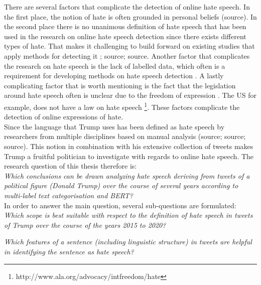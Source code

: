 \documentclass[a4paper,pdf]{article}
\begin{document}
There are several factors that complicate the detection of online hate speech. In the first place, the notion of hate is often grounded in personal beliefs (source). In the second place there is no unanimous definition of hate speech that has been used in the research on online hate speech detection \cite{Salminen2020DevelopingPlatforms} since there exists different types of hate. That makes it challenging to build forward on existing studies that apply methods for detecting it \cite{Salminen2020DevelopingPlatforms}; source; source. Another factor that complicates the research on hate speech is the lack of labelled data, which often is a requirement for developing methods on hate speech detection \cite{Davidson2019RacialDatasets}. A lastly complicating factor that is worth mentioning is the fact that the legislation around hate speech often is unclear due to the freedom of expression \cite{Brown2018WhatSpeech}. The US for example, does not have a law on hate speech \footnote{http://www.ala.org/advocacy/intfreedom/hate}. These factors complicate the detection of online expressions of hate.\\

Since the language that Trump uses has been defined as hate speech by researchers from multiple disciplines based on manual analysis (source; source; source). This notion in combination with his extensive collection of tweets makes Trump a fruitful politician to investigate with regards to online hate speech. The research question of this thesis therefore is:\\

\emph{Which conclusions can be drawn analyzing hate speech deriving from tweets of a political figure (Donald Trump) over the course of several years according to multi-label text categorisation and BERT?}\\
\break{}
In order to answer the main question, several sub-questions are formulated: \\

\emph{Which scope is best suitable with respect to the definition of hate speech in tweets of Trump over the course of the years 2015 to 2020?}

\emph{Which features of a sentence (including linguistic structure) in tweets are helpful in identifying the sentence  as hate speech?}
\end{document}
